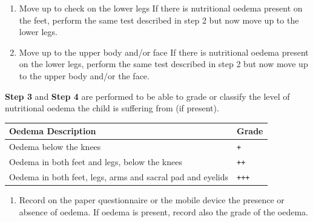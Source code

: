 \documentclass[12pt,]{book}
\providecommand{\tightlist}{%
  \setlength{\itemsep}{0pt}\setlength{\parskip}{0pt}}
\theoremstyle{definition}
\theoremstyle{definition}
\theoremstyle{definition}
\theoremstyle{remark}
\begin{document}
\begin{enumerate}
\def\labelenumi{\arabic{enumi}.}
\setcounter{enumi}{2}
\item
  Move up to check on the lower legs If there is nutritional oedema
  present on the feet, perform the same test described in step 2 but now
  move up to the lower legs.
\item
  Move up to the upper body and/or face If there is nutritional oedema
  present on the lower legs, perform the same test described in step 2
  but now move up to the upper body and/or the face.
\end{enumerate}

\textbf{Step 3} and \textbf{Step 4} are performed to be able to grade or
classify the level of nutritional oedema the child is suffering from (if
present).

\begin{longtable}[]{@{}ll@{}}
\toprule
\begin{minipage}[b]{0.75\columnwidth}\raggedright
\textbf{Oedema Description}\strut
\end{minipage} & \begin{minipage}[b]{0.20\columnwidth}\raggedright
\textbf{Grade}\strut
\end{minipage}\tabularnewline
\midrule
\endhead
\begin{minipage}[t]{0.75\columnwidth}\raggedright
Oedema below the knees\strut
\end{minipage} & \begin{minipage}[t]{0.20\columnwidth}\raggedright
\texttt{+}\strut
\end{minipage}\tabularnewline
\begin{minipage}[t]{0.75\columnwidth}\raggedright
Oedema in both feet and legs, below the knees\strut
\end{minipage} & \begin{minipage}[t]{0.20\columnwidth}\raggedright
\texttt{++}\strut
\end{minipage}\tabularnewline
\begin{minipage}[t]{0.75\columnwidth}\raggedright
Oedema in both feet, legs, arms and sacral pad and eyelids\strut
\end{minipage} & \begin{minipage}[t]{0.20\columnwidth}\raggedright
\texttt{+++}\strut
\end{minipage}\tabularnewline
\bottomrule
\end{longtable}

\begin{enumerate}
\def\labelenumi{\arabic{enumi}.}
\setcounter{enumi}{4}
\tightlist
\item
  Record on the paper questionnaire or the mobile device the presence or
  absence of oedema. If oedema is present, record also the grade of the
  oedema.
\end{enumerate}
\end{document}
